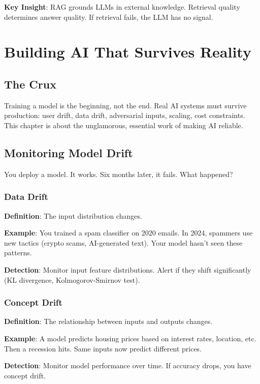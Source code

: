 \documentclass[11pt,oneside]{book}
\newcommand{\blankpage}{%
    \clearpage
    \thispagestyle{empty}
    \mbox{}
    \clearpage
}
\begin{document}
\textbf{Key Insight}: RAG grounds LLMs in external knowledge. Retrieval quality determines answer quality. If retrieval fails, the LLM has no signal.

\blankpage


\chapter{Building AI That Survives Reality}

\section{The Crux}
Training a model is the beginning, not the end. Real AI systems must survive production: user drift, data drift, adversarial inputs, scaling, cost constraints. This chapter is about the unglamorous, essential work of making AI reliable.

\section{Monitoring Model Drift}

You deploy a model. It works. Six months later, it fails. What happened?

\subsection{Data Drift}

\textbf{Definition}: The input distribution changes.

\textbf{Example}: You trained a spam classifier on 2020 emails. In 2024, spammers use new tactics (crypto scams, AI-generated text). Your model hasn't seen these patterns.

\textbf{Detection}: Monitor input feature distributions. Alert if they shift significantly (KL divergence, Kolmogorov-Smirnov test).

\subsection{Concept Drift}

\textbf{Definition}: The relationship between inputs and outputs changes.

\textbf{Example}: A model predicts housing prices based on interest rates, location, etc. Then a recession hits. Same inputs now predict different prices.

\textbf{Detection}: Monitor model performance over time. If accuracy drops, you have concept drift.
\end{document}
